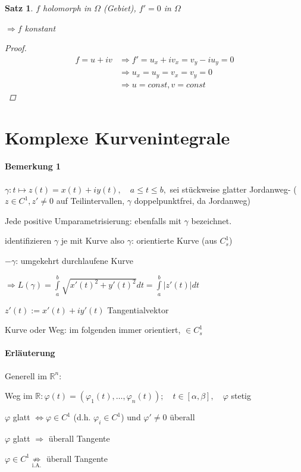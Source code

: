 \documentclass[ngerman,halfparskip]{scrartcl}
\newtheorem{satz}{Satz}[section]
\theoremstyle{definition}
\def\R{\mathbb R}
\begin{document}
\begin{satz} $f$ holomorph in $\Omega$ (Gebiet), $f'=0$ in $\Omega$

$\Rightarrow f$ konstant
\begin{proof}
\begin{align*}f=u+iv &\Rightarrow f'=u_x+iv_x=v_y-iu_y=0 \\
&\Rightarrow u_x=u_y=v_x=v_y=0\\
&\Rightarrow u=const, v=const\end{align*}
\end{proof}
\end{satz}

\section{Komplexe Kurvenintegrale}
\paragraph{Bemerkung 1} $\gamma: t\mapsto z(t)=x(t)+iy(t), \quad a\leq t\leq b, $ sei stückweise glatter Jordanweg- ($z\in C^1, z'\neq 0$ auf Teilintervallen, $\gamma$ doppelpunktfrei, da Jordanweg)

Jede positive Umparametrisierung: ebenfalls mit $\gamma$ bezeichnet.

identifizieren $\gamma$ je  mit Kurve also $\gamma$: orientierte Kurve (aus $C^1_s$)

$-\gamma$: umgekehrt durchlaufene Kurve

$\Rightarrow L(\gamma )=\int\limits _a^b\sqrt{x'(t)^2+y'(t)^2}dt=\int\limits _a^b|z'(t)|dt$

$z'(t):=x'(t)+iy'(t)$ Tangentialvektor

Kurve oder Weg: im folgenden immer orientiert, $\in C_s^1$

\paragraph{Erläuterung} Generell im $\R^n:$

Weg im $\R: \varphi (t)=(\varphi_1(t),\ldots,\varphi_n(t)); \quad t\in [\alpha,\beta], \quad \varphi$ stetig

$\varphi$ glatt $\Leftrightarrow \varphi\in C^1$ (d.h. $\varphi_i\in C^1$) und $\varphi'\neq 0$ überall 

$\varphi$ glatt $\Rightarrow$ überall Tangente

$\varphi\in C^1 \underset{\text{i.A.}}{\not\Rightarrow}$ überall Tangente
\end{document}

